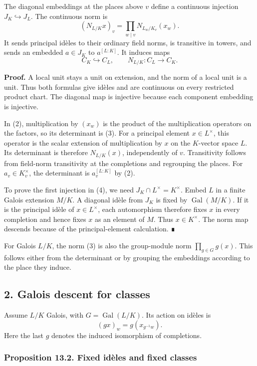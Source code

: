 \documentclass[11pt,a4paper]{article}
\begin{document}
The diagonal embeddings at the places above \(v\) define a continuous
injection \(J_K\hookrightarrow J_L\). The continuous norm is \[
(N_{L/K}x)_v=\prod_{w\mid v}N_{L_w/K_v}(x_w).
\tag{3}
\] It sends principal idèles to their ordinary field norms, is
transitive in towers, and sends an embedded \(a\in J_K\) to
\(a^{[L:K]}\). It induces maps \[
C_K\hookrightarrow C_L,\qquad N_{L/K}:C_L\longrightarrow C_K.
\tag{4}
\]

\textbf{Proof.} A local unit stays a unit on extension, and the norm of
a local unit is a unit. Thus both formulas give idèles and are
continuous on every restricted product chart. The diagonal map is
injective because each component embedding is injective.

In (2), multiplication by \((x_w)\) is the product of the multiplication
operators on the factors, so its determinant is (3). For a principal
element \(x\in L^\times\), this operator is the scalar extension of
multiplication by \(x\) on the \(K\)-vector space \(L\). Its determinant
is therefore \(N_{L/K}(x)\), independently of \(v\). Transitivity
follows from field-norm transitivity at the completions and regrouping
the places. For \(a_v\in K_v^\times\), the determinant is
\(a_v^{[L:K]}\) by (2).

To prove the first injection in (4), we need
\(J_K\cap L^\times=K^\times\). Embed \(L\) in a finite Galois extension
\(M/K\). A diagonal idèle from \(J_K\) is fixed by
\(\operatorname{Gal}(M/K)\). If it is the principal idèle of
\(x\in L^\times\), each automorphism therefore fixes \(x\) in every
completion and hence fixes \(x\) as an element of \(M\). Thus
\(x\in K^\times\). The norm map descends because of the
principal-element calculation. ∎

For Galois \(L/K\), the norm (3) is also the group-module norm
\(\prod_{g\in G}g(x)\). This follows either from the determinant or by
grouping the embeddings according to the place they induce.

\subsection{2. Galois descent for
classes}\label{galois-descent-for-classes}

Assume \(L/K\) Galois, with \(G=\operatorname{Gal}(L/K)\). Its action on
idèles is \[
(g x)_w=g(x_{g^{-1}w}).
\tag{5}
\] Here the last \(g\) denotes the induced isomorphism of completions.

\subsubsection{Proposition 13.2. Fixed idèles and fixed
classes}\label{proposition-13.2.-fixed-iduxe8les-and-fixed-classes}
\end{document}
